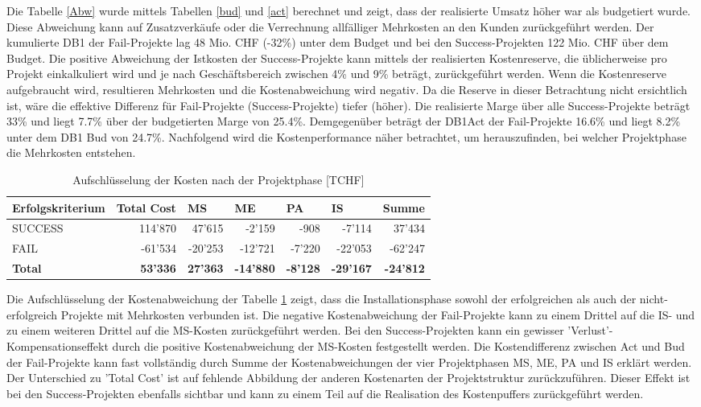 Die Tabelle \ref{Abw} wurde mittels Tabellen \ref{bud} und \ref{act} berechnet und zeigt, dass der realisierte Umsatz höher war als budgetiert wurde. Diese Abweichung kann auf Zusatzverkäufe oder die Verrechnung allfälliger Mehrkosten an den Kunden zurückgeführt werden. Der kumulierte DB1 der Fail-Projekte lag 48 Mio. CHF (-32\%) unter dem Budget und bei den Success-Projekten 122 Mio. CHF über dem Budget. Die positive Abweichung der Istkosten der Success-Projekte kann mittels der realisierten Kostenreserve, die üblicherweise pro Projekt einkalkuliert wird und je nach Geschäftsbereich zwischen 4\% und 9\% beträgt, zurückgeführt werden. Wenn die Kostenreserve aufgebraucht wird, resultieren Mehrkosten und die Kostenabweichung wird negativ. Da die Reserve in dieser Betrachtung nicht ersichtlich ist, wäre die effektive Differenz für Fail-Projekte (Success-Projekte) tiefer (höher). Die realisierte Marge über alle Success-Projekte beträgt 33\% und liegt 7.7\% über der budgetierten Marge von 25.4\%. Demgegenüber beträgt der DB1Act der Fail-Projekte 16.6\% und liegt 8.2\% unter dem DB1 Bud von 24.7\%. Nachfolgend wird die Kostenperformance näher betrachtet, um herauszufinden, bei welcher Projektphase die Mehrkosten entstehen.
\begin{table}[H]
	\centering
	\caption{Aufschlüsselung der Kosten nach der Projektphase [TCHF]}
	\begin{tabular}{lrrrrr|r}
		\textbf{Erfolgskriterium} & \multicolumn{1}{l}{\textbf{Total Cost}} & \multicolumn{1}{l}{\textbf{MS}} & \multicolumn{1}{l}{\textbf{ME}} & \multicolumn{1}{l}{\textbf{PA}} & \multicolumn{1}{l}{\textbf{IS}} & \multicolumn{1}{l}{\textbf{Summe}} \\\hline
		SUCCESS & 114'870 & 47'615 & -2'159 & -908  & -7'114 & 37'434 \\
		FAIL  & -61'534 & -20'253 & -12'721 & -7'220 & -22'053 & -62'247 \\\hline
		\textbf{ Total} & \textbf{53'336} & \textbf{ 27'363} & \textbf{ -14'880} & 
		\textbf{ -8'128} & \textbf{ -29'167} & \textbf{ -24'812} \\
	\end{tabular}%
	\label{stocostdb1dev}%
\end{table}%
Die Aufschlüsselung der Kostenabweichung der Tabelle \ref{stocostdb1dev} zeigt, dass die Installationsphase sowohl der erfolgreichen als auch der nicht-erfolgreich Projekte mit Mehrkosten verbunden ist. Die negative Kostenabweichung der Fail-Projekte kann zu einem Drittel auf die IS- und zu einem weiteren Drittel auf die MS-Kosten zurückgeführt werden. Bei den Success-Projekten kann ein gewisser 'Verlust'-Kompensationseffekt durch die positive Kostenabweichung der MS-Kosten festgestellt werden. Die Kostendifferenz zwischen Act und Bud der Fail-Projekte kann fast vollständig durch Summe der Kostenabweichungen der vier Projektphasen MS, ME, PA und IS erklärt werden. Der Unterschied zu 'Total Cost' ist auf fehlende Abbildung der anderen Kostenarten der Projektstruktur zurückzuführen. Dieser Effekt ist bei den Success-Projekten ebenfalls sichtbar und kann zu einem Teil auf die Realisation des Kostenpuffers zurückgeführt werden.
